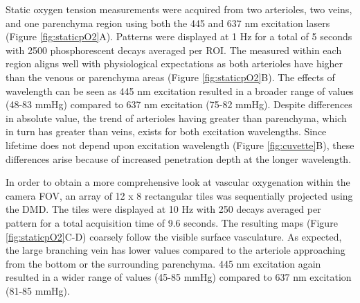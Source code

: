 Static oxygen tension measurements were acquired from two arterioles, two veins, and one parenchyma region using both the 445 and 637 nm excitation lasers (Figure \ref{fig:staticpO2}A). Patterns were displayed at 1 Hz for a total of 5 seconds with 2500 phosphorescent decays averaged per ROI. The measured  within each region aligns well with physiological expectations as both arterioles have higher  than the venous or parenchyma areas (Figure \ref{fig:staticpO2}B). The effects of wavelength can be seen as 445 nm excitation resulted in a broader range of  values (48-83 mmHg) compared to 637 nm excitation (75-82 mmHg). Despite differences in absolute value, the trend of arterioles having greater  than parenchyma, which in turn has greater  than veins, exists for both excitation wavelengths. Since lifetime does not depend upon excitation wavelength (Figure \ref{fig:cuvette}B), these differences arise because of increased penetration depth at the longer wavelength.

In order to obtain a more comprehensive look at vascular oxygenation within the camera FOV, an array of 12 x 8 rectangular tiles was sequentially projected using the DMD. The tiles were displayed at 10 Hz with 250 decays averaged per pattern for a total acquisition time of 9.6 seconds. The resulting  maps (Figure \ref{fig:staticpO2}C-D) coarsely follow the visible surface vasculature. As expected, the large branching vein has lower  values compared to the arteriole approaching from the bottom or the surrounding parenchyma. 445 nm excitation again resulted in a wider range of  values (45-85 mmHg) compared to 637 nm excitation (81-85 mmHg).

